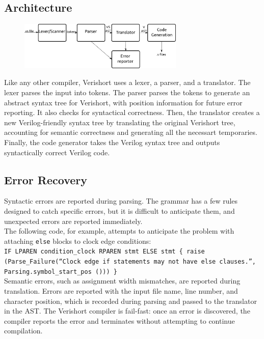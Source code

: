 \documentclass[letterpaper,11pt]{article}
\begin{document}
    \subsection{Architecture}
    \begin{figure}\begin{center}\includegraphics[width=0.7\textwidth]{blockdiagram-inkscape.pdf}\end{center}\end{figure}
    Like any other compiler, Verishort uses a lexer, a parser, and a translator.  The lexer parses the input into tokens.  The parser parses the tokens to generate an abstract syntax tree for Verishort, with position information for future error reporting.  It also checks for syntactical correctness.  Then, the translator creates a new Verilog-friendly syntax tree by translating the original Verishort tree, accounting for semantic correctness and generating all the necessart temporaries.  Finally, the code generator takes the Verilog syntax tree and outputs syntactically correct Verilog code.
    \subsection{Error Recovery}
	Syntactic errors are reported during parsing. The grammar has a few rules designed to catch specific errors, but it is difficult to anticipate them, and unexpected errors are reported immediately.\\ 
	The following code, for example, attempts to anticipate the problem with attaching \texttt{else} blocks to clock edge conditions:\\
	\texttt{IF LPAREN condition\_clock RPAREN stmt ELSE stmt \{ raise (Parse\_Failure(``Clock edge if statements may not have else clauses.'', Parsing.symbol\_start\_pos ())) \}}\\
Semantic errors, such as assignment width mismatches, are reported during translation.  Errors are reported with the input file name, line number, and character position, which is recorded during parsing and passed to the translator in the AST.  The Verishort compiler is fail-fast: once an error is discovered, the compiler reports the error and terminates without attempting to continue compilation.
\end{document}
